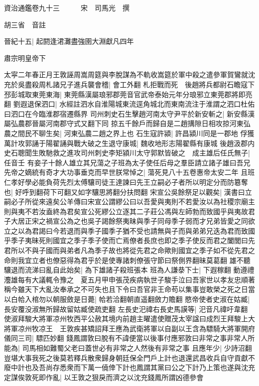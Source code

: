 資治通鑑卷九十三　　　宋　司馬光　撰

胡三省　音註

晉紀十五|{
	起閼逢涒灘盡強圉大淵獻凡四年}


肅宗明皇帝下

太寜二年春正月王敦誣周嵩周筵與李脫謀為不軌收嵩筵於軍中殺之遣參軍賀鸞就沈充於吳盡殺周札諸兄子進兵襲會稽|{
	會工外翻}
札拒戰而死　後趙將兵都尉石瞻寇下邳彭城取東莞東海|{
	東莞縣漢屬琅邪郡莞音官武帝泰始元年分琅邪立東莞郡將即亮翻}
劉遐退保泗口|{
	水經註泗水自淮陽城東流逕角城北而東南流注于淮謂之泗口杜佑曰泗口在今臨淮郡宿遷縣界}
司州刺史石生擊趙河南太守尹平於新安斬之|{
	新安縣漢屬弘農郡晉屬河南郡守式又翻下同}
掠五千餘戶而歸自是二趙搆隙日相攻掠河東弘農之間民不聊生矣|{
	河東弘農二趙之界上也}
石生寇許潁|{
	許昌潁川同是一郡地}
俘獲萬計攻郭誦于陽翟誦與戰大破之生退守康城|{
	魏收地形志陽翟縣有康城}
後趙汲郡内史石聰聞生敗馳救之進攻司州刺史李矩潁川太守郭默皆破之　成主雄后任氏無子|{
	任音壬}
有妾子十餘人雄立其兄蕩之子班為太子使任后母之羣臣請立諸子雄曰吾兄先帝之嫡統有奇才大功事垂克而早世朕常悼之|{
	蕩死見八十五卷惠帝太安二年}
且班仁孝好學必能負荷先烈太傅驤司徒王達諫曰先王立嗣必子者所以明定分而防簒奪也|{
	好呼到翻荷下可翻又如字驤思將翻分扶問翻}
宋宣公吳餘祭足以觀矣|{
	漢書曰立嗣必子所從來遠矣公羊傳曰宋宣公謂繆公曰以吾愛與夷則不若愛汝以為社稷宗廟主則與夷不若汝盍終為君矣宣公死繆公立逐其二子莊公馮與左師勃而致國乎與夷故君子大居正宋之禍宣公為之也吳子謁餘祭夷昧與季子同母季子弱而才兄弟皆愛之同欲立之以為君謁曰今若退而與季子國季子猶不受也請無與子而與弟弟兄迭為君而致國乎季子夷昧死則國宜之季子季子使而亡焉僚者長庶也即之季子使反而君之闔閭曰先君所以不與子國而與弟者凡為季子故也將從先君之命歟則國宜之季子如不從先君之命則我宜立者也僚惡得為君乎於是使專諸刺僚張守節曰祭側界翻昧莫葛翻}
雄不聽驤退而流涕曰亂自此始矣|{
	為下雄諸子殺班張本}
班為人謙㳟下士|{
	下遐稼翻}
動遵禮灋雄每有大議輒令豫之　夏五月甲申張茂疾病執世子駿手泣曰吾家世以孝友忠順著稱今雖天下大亂汝奉承之不可失也且下令曰吾官非王命苟以集事豈敢榮之死之日當以白帢入棺勿以朝服斂是日薨|{
	帢若洽翻朝直遥翻斂力贍翻}
愍帝使者史淑在姑臧|{
	長安覆没淑無所歸故留姑臧使疏吏翻}
左長史汜禕右長史馬謨等|{
	汜音凡禕吁韋翻}
使淑拜駿大將軍凉州牧西平公赦其境内前趙主曜遣使贈茂太宰諡曰成烈王拜駿上大將軍凉州牧凉王　王敦疾甚矯詔拜王應為武衛將軍以自副以王含為驃騎大將軍開府儀同三司|{
	驃匹妙翻}
錢鳳謂敦曰脫有不諱便當以後事付應邪敦曰非常之事非常人所能為|{
	司馬相如難蜀父老曰蓋世必有非常之人然後有非常之事}
且應年少|{
	少詩沼翻}
豈堪大事我死之後莫若釋兵散衆歸身朝廷保全門戶上計也退還武昌收兵自守貢獻不廢中計也及吾尚存悉衆而下萬一僥倖下計也鳳謂其黨曰公之下計乃上策也遂與沈充定謀俟敦死即作亂|{
	以王敦之狠戾而濟之以沈充錢鳳所謂凶德參會}
